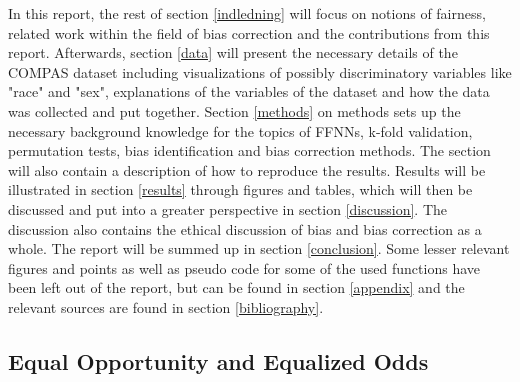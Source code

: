 \documentclass[11pt, fleqn, titlepage]{article}
\begin{document}
	\noindent In this report, the rest of section \ref{indledning} will focus on notions of fairness, related work within the field of bias correction and the contributions from this report. Afterwards, section \ref{data} will present the necessary details of the COMPAS dataset including visualizations of possibly discriminatory variables like "race" and "sex", explanations of the variables of the dataset and how the data was collected and put together. Section \ref{methods} on methods sets up the necessary background knowledge for the topics of FFNNs, k-fold validation, permutation tests, bias identification and bias correction methods. The section will also contain a description of how to reproduce the results. Results will be illustrated in section \ref{results} through figures and tables, which will then be discussed and put into a greater perspective in section \ref{discussion}. The discussion also contains the ethical discussion of bias and bias correction as a whole. The report will be summed up in section \ref{conclusion}. Some lesser relevant figures and points as well as pseudo code for some of the used functions have been left out of the report, but can be found in section \ref{appendix} and the relevant sources are found in section \ref{bibliography}.
	
	\subsection{Equal Opportunity and Equalized Odds}\label{bias_def}
	
\end{document}
